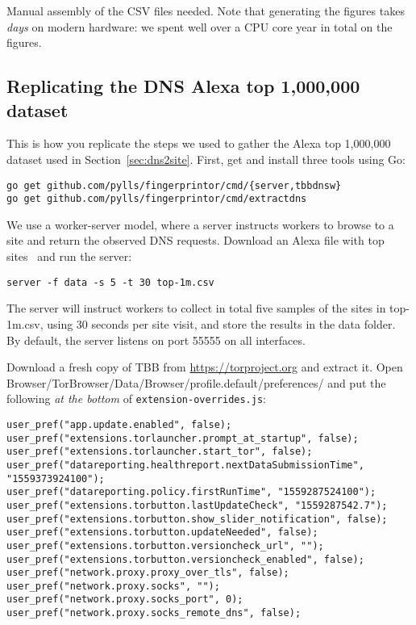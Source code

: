 Manual assembly of the CSV files needed.
Note that generating the figures takes \emph{days} on modern
hardware: we spent well over a CPU core year in total on the figures.

\subsection{Replicating the DNS Alexa top 1,000,000 dataset}
This is how you replicate the steps we used to gather the Alexa top 1,000,000
dataset used in Section~\ref{sec:dns2site}.
First, get and install three tools using Go:

\begin{lstlisting}
go get github.com/pylls/fingerprintor/cmd/{server,tbbdnsw}
go get github.com/pylls/fingerprintor/cmd/extractdns
\end{lstlisting}

We use a worker-server model, where a server instructs workers to browse to a
site and return the observed DNS requests. Download an Alexa file with top
sites~\cite{alexatop1k} and run the server:

\begin{lstlisting}
server -f data -s 5 -t 30 top-1m.csv
\end{lstlisting}
The server will instruct workers to collect in total
five samples of the sites in top-1m.csv, using 30 seconds per site visit,
and store the results in the data folder. By default, the server listens on
port 55555 on all interfaces.

Download a fresh copy of TBB from \url{https://torproject.org} and extract it.
Open Browser/TorBrowser/Data/Browser/profile.default/preferences/
and put the
following \emph{at the bottom} of \texttt{extension-overrides.js}:

\begin{lstlisting}
user_pref("app.update.enabled", false);
user_pref("extensions.torlauncher.prompt_at_startup", false);
user_pref("extensions.torlauncher.start_tor", false);
user_pref("datareporting.healthreport.nextDataSubmissionTime", "1559373924100");
user_pref("datareporting.policy.firstRunTime", "1559287524100");
user_pref("extensions.torbutton.lastUpdateCheck", "1559287542.7");
user_pref("extensions.torbutton.show_slider_notification", false);
user_pref("extensions.torbutton.updateNeeded", false);
user_pref("extensions.torbutton.versioncheck_url", "");
user_pref("extensions.torbutton.versioncheck_enabled", false);
user_pref("network.proxy.proxy_over_tls", false);
user_pref("network.proxy.socks", "");
user_pref("network.proxy.socks_port", 0);
user_pref("network.proxy.socks_remote_dns", false);
\end{lstlisting}

